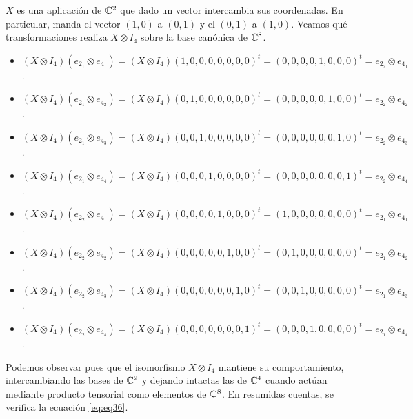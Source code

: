 \begin{example}
$X$ es una aplicación de $\mathbb{C}^2$ que dado un vector intercambia sus coordenadas. En particular, manda el vector $(1,0)$ a $(0,1)$ y el $(0,1)$ a $(1,0)$. Veamos qué transformaciones realiza $X\otimes I_4$ sobre la base canónica de $\mathbb{C}^8$.
\begin{itemize}
\item $(X\otimes I_4)(e_{2_1}\otimes e_{4_1})=(X\otimes I_4)(1,0,0,0,0,0,0,0)^t=(0,0,0,0,1,0,0,0)^t = e_{2_2}\otimes e_{4_1}$.
\item $(X\otimes I_4)(e_{2_1}\otimes e_{4_2})=(X\otimes I_4)(0,1,0,0,0,0,0,0)^t=(0,0,0,0,0,1,0,0)^t = e_{2_2}\otimes e_{4_2}$.
\item $(X\otimes I_4)(e_{2_1}\otimes e_{4_3})=(X\otimes I_4)(0,0,1,0,0,0,0,0)^t=(0,0,0,0,0,0,1,0)^t = e_{2_2}\otimes e_{4_3}$.
\item $(X\otimes I_4)(e_{2_1}\otimes e_{4_4})=(X\otimes I_4)(0,0,0,1,0,0,0,0)^t=(0,0,0,0,0,0,0,1)^t = e_{2_2}\otimes e_{4_4}$.
\item $(X\otimes I_4)(e_{2_2}\otimes e_{4_1})=(X\otimes I_4)(0,0,0,0,1,0,0,0)^t=(1,0,0,0,0,0,0,0)^t = e_{2_1}\otimes e_{4_1}$.
\item $(X\otimes I_4)(e_{2_2}\otimes e_{4_2})=(X\otimes I_4)(0,0,0,0,0,1,0,0)^t=(0,1,0,0,0,0,0,0)^t = e_{2_1}\otimes e_{4_2}$.
\item $(X\otimes I_4)(e_{2_2}\otimes e_{4_3})=(X\otimes I_4)(0,0,0,0,0,0,1,0)^t=(0,0,1,0,0,0,0,0)^t = e_{2_1}\otimes e_{4_3}$.
\item $(X\otimes I_4)(e_{2_2}\otimes e_{4_4})=(X\otimes I_4)(0,0,0,0,0,0,0,1)^t=(0,0,0,1,0,0,0,0)^t = e_{2_1}\otimes e_{4_4}$.
\end{itemize}

Podemos observar pues que el isomorfismo $X\otimes I_4$ mantiene su comportamiento, intercambiando las bases de $\mathbb{C}^2$ y dejando intactas las de $\mathbb{C}^4$ cuando actúan mediante producto tensorial como elementos de $\mathbb{C}^8$. En resumidas cuentas, se verifica la ecuación \ref{eq:eq36}.
\end{example}